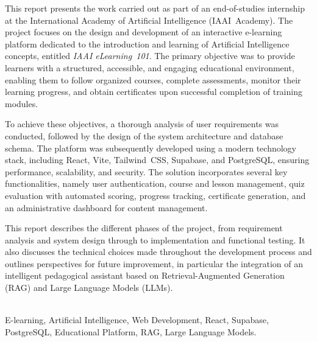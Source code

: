 \documentclass[12pt, a4paper]{report}
\begin{document}
\vspace{0.5cm}

\onehalfspacing
{\selectfont\fontsize{12}{18}\selectfont

This report presents the work carried out as part of an end-of-studies internship
at the International Academy of Artificial Intelligence (IAAI~Academy). The project
focuses on the design and development of an interactive e-learning platform dedicated
to the introduction and learning of Artificial Intelligence concepts, entitled
\textit{IAAI eLearning~101}. The primary objective was to provide learners with a
structured, accessible, and engaging educational environment, enabling them to follow
organized courses, complete assessments, monitor their learning progress, and obtain
certificates upon successful completion of training modules.

To achieve these objectives, a thorough analysis of user requirements was conducted,
followed by the design of the system architecture and database schema. The platform
was subsequently developed using a modern technology stack, including React, Vite,
Tailwind~CSS, Supabase, and PostgreSQL, ensuring performance, scalability, and
security. The solution incorporates several key functionalities, namely user
authentication, course and lesson management, quiz evaluation with automated scoring,
progress tracking, certificate generation, and an administrative dashboard for
content management.

This report describes the different phases of the project, from requirement analysis
and system design through to implementation and functional testing. It also discusses
the technical choices made throughout the development process and outlines
perspectives for future improvement, in particular the integration of an intelligent
pedagogical assistant based on Retrieval-Augmented Generation (RAG) and Large
Language Models (LLMs).

}

\vspace{0.5cm}

\\[0.2cm]
{\selectfont\fontsize{12}{16}\selectfont
E-learning, Artificial Intelligence, Web Development, React, Supabase, PostgreSQL,
Educational Platform, RAG, Large Language Models.
}

\clearpage
{}
\listoffigures
\end{document}
